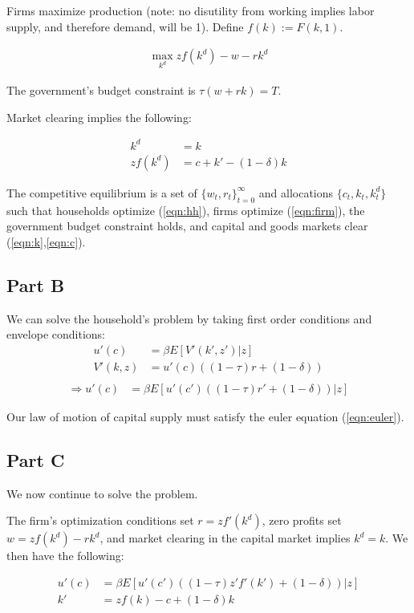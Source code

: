 \documentclass[11pt]{article} %
\begin{document}
Firms maximize production (note: no disutility from working implies labor supply, and therefore demand, will be 1). Define $f(k):= F(k,1)$.

\begin{align}
\max_{k^d} zf(k^d) - w - rk^d \label{eqn:firm}
\end{align}

The government's budget constraint is $\tau(w+rk) = T$.

Market clearing implies the following:

\begin{align}
k^d &= k\label{eqn:k}\\
zf(k^d) &= c+ k' - (1-\delta)k\label{eqn:c}
\end{align}

The competitive equilibrium is a set of $\{w_t,r_t\}_{t=0}^{\infty}$ and allocations $\{c_t,k_t, k_t^d\}$ such that households optimize (\ref{eqn:hh}), firms optimize (\ref{eqn:firm}), the government budget constraint holds, and capital and goods markets clear (\ref{eqn:k},\ref{eqn:c}).

\subsection{Part B}
We can solve the household's problem by taking first order conditions and envelope conditions:
\begin{align*}
u'(c)&= \beta E[V'(k',z')|z]\\
V'(k,z) &= u'(c)((1-\tau)r + (1-\delta))\\
\end{align*}
\begin{align}
\Rightarrow u'(c)&= \beta E[u'(c')((1-\tau)r' + (1-\delta))|z] \label{eqn:euler}
\end{align}

Our law of motion of capital supply must satisfy the euler equation (\ref{eqn:euler}).

\subsection{Part C}
We now continue to solve the problem.

The firm's optimization conditions set $r = zf'(k^d)$, zero profits set $w = zf(k^d) - rk^d$, and market clearing in the capital market implies $k^d = k$. We then have the following:

\begin{align}
 u'(c)&= \beta E[u'(c')((1-\tau)z'f'(k') + (1-\delta))|z] \label{eqn:eq1}\\
k' &= zf(k) - c + (1-\delta)k\label{eqn:eq2}
\end{align}
\end{document}
